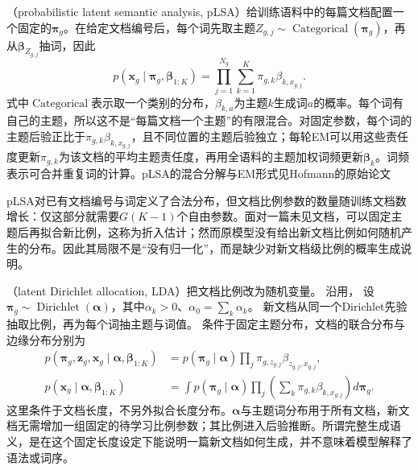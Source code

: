 （probabilistic latent semantic analysis, pLSA）给训练语料中的每篇文档配置一个固定的$\bm{\pi}_g$。在给定文档编号后，每个词先取主题$Z_{g,j}\sim\operatorname{Categorical}(\bm{\pi}_g)$，再从$\bm{\beta}_{Z_{g,j}}$抽词，因此
\begin{equation}
  \label{eq:pgm-static-directed-plsa}
  p(\bm{x}_g\mid\bm{\pi}_g,\bm{\beta}_{1:K})
    =\prod_{j=1}^{N_g}
       \sum_{k=1}^{K}\pi_{g,k}\beta_{k,x_{g,j}}.
\end{equation}
式中$\operatorname{Categorical}$表示取一个类别的分布，$\beta_{k,a}$为主题$k$生成词$a$的概率。每个词有自己的主题，所以这不是“每篇文档一个主题”的有限混合。对固定参数，每个词的主题后验正比于$\pi_{g,k}\beta_{k,x_{g,j}}$，且不同位置的主题后验独立；每轮EM可以用这些责任度更新$\pi_{g,k}$为该文档的平均主题责任度，再用全语料的主题加权词频更新$\bm{\beta}_k$。词频表示可合并重复词的计算。pLSA的混合分解与EM形式见Hofmann的原始论文

pLSA对已有文档编号与词定义了合法分布，但文档比例参数的数量随训练文档数增长：仅这部分就需要$G(K-1)$个自由参数。面对一篇未见文档，可以固定主题后再拟合新比例，这称为折入估计；然而原模型没有给出新文档比例如何随机产生的分布。因此其局限不是“没有归一化”，而是缺少对新文档级比例的概率生成说明。

（latent Dirichlet allocation, LDA）把文档比例改为随机变量。
沿用，
设$\bm\pi_g\sim\operatorname{Dirichlet}(\bm\alpha)$，其中$\alpha_k>0$、$\alpha_0=\sum_k\alpha_k$。
新文档从同一个Dirichlet先验抽取比例，再为每个词抽主题与词值。
条件于固定主题分布，文档的联合分布与边缘分布分别为
\begin{equation}
  \label{eq:pgm-static-directed-lda}
  \begin{aligned}
    p(\bm{\pi}_g,\bm{z}_g,\bm{x}_g\mid
          \bm{\alpha},\bm{\beta}_{1:K})
      &=p(\bm{\pi}_g\mid\bm{\alpha})
         \prod_j\pi_{g,z_{g,j}}\beta_{z_{g,j},x_{g,j}},\\
    p(\bm{x}_g\mid\bm{\alpha},\bm{\beta}_{1:K})
      &=\int p(\bm{\pi}_g\mid\bm{\alpha})
          \prod_j\left(\sum_k
              \pi_{g,k}\beta_{k,x_{g,j}}\right)d\bm{\pi}_g.
  \end{aligned}
\end{equation}
这里条件于文档长度，不另外拟合长度分布。$\bm{\alpha}$与主题词分布用于所有文档，新文档无需增加一组固定的待学习比例参数；其比例进入后验推断。所谓完整生成语义，是在这个固定长度设定下能说明一篇新文档如何生成，并不意味着模型解释了语法或词序。

